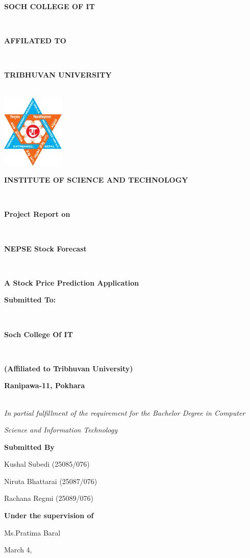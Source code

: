 \documentclass[./main.tex]{subfiles}
\begin{document}
\begin{titlepage}
    \centering
    {\par\noindent\large\bfseries\MakeUppercase{Soch College of IT}}\\
    {\par\noindent\large\bfseries\MakeUppercase{Affilated to}} \\
    {\par\noindent\large\bfseries\MakeUppercase{Tribhuvan University}}\\
    \includegraphics[width=3cm]{images/TribhuvanUniversityLogo.png}\\
    {\par\noindent\large\bfseries\MakeUppercase{Institute of Science and Technology}}\\
    \par\vspace{1cm}
    {\par\noindent\large\bfseries{Project Report on}}\\
    {\par\noindent\Large\bfseries{ NEPSE Stock Forecast }}\\
    {\par\noindent\large\bfseries{A Stock Price Prediction Application}}
    \vspace{0.5cm}
    {\par\large \textbf {{Submitted To:}}} \\
    {\par\large \textbf {{Soch College Of IT}}} \\
    {\par \large \textbf {{(Affiliated to Tribhuvan University)}}}
    {\par\large \textbf {{Ranipawa-11, Pokhara}}}\\
    \textit{In partial fulfillment of the requirement for the Bachelor Degree in Computer}

\textit{Science and Information Technology}
    \vspace{2cm}
    
    {\par\large\bfseries Submitted By}
    {\par\large Kushal Subedi (25085/076) }
    {\par\large Niruta Bhattarai (25087/076)}
    {\par\large Rachana Regmi (25089/076)
    }

    \vspace{0.5cm}    


{\par\large\bfseries Under the supervision of}
{\par\large Ms.Pratima Baral}
\vspace{0.3cm}
{\par{March} {4},{\the\year}}

\end{titlepage}
\end{document}
